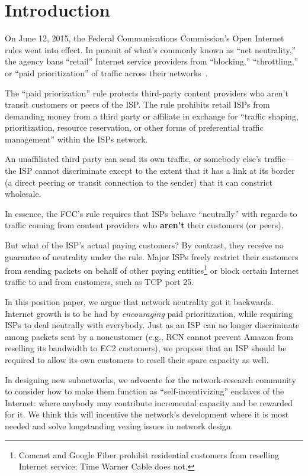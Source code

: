 \section{Introduction}

\label{sec:intro}

On June 12, 2015, the Federal Communications Commission's Open
Internet rules went into effect. In pursuit of what's commonly known
as ``net neutrality,'' the agency bans ``retail'' Internet service
providers from ``blocking,'' ``throttling,'' or ``paid
prioritization'' of traffic across their networks~\cite{openinternet}.

The ``paid priorization'' rule protects third-party
content providers who aren't transit customers or peers of the
ISP. The rule prohibits retail ISPs from demanding money from a third
party or affiliate in exchange for ``traffic shaping, prioritization,
resource reservation, or other forms of preferential traffic
management'' within the ISPs network.

An unaffiliated third party can send its own traffic, or somebody
else's traffic---the ISP cannot discriminate except to the extent that
it has a link at its border (a direct peering or transit connection to
the sender) that it can constrict wholesale.

In essence, the FCC's rule requires that ISPs behave ``neutrally''
with regards to traffic coming from content providers who
\textbf{aren't} their customers (or peers).

But what of the ISP's actual paying customers? By contrast, they
receive no guarantee of neutrality under the rule. Major ISPs freely
restrict their customers from sending packets on behalf of other
paying entities\footnote{Comcast and Google Fiber prohibit residential
  customers from reselling Internet service; Time Warner Cable does
  not.} or block certain Internet traffic to and from
customers, such as TCP port 25.

In this position paper, we argue that network neutrality got it
backwards. Internet growth is to be had by \emph{encouraging} paid
prioritization, while requiring ISPs to deal neutrally with
everybody. Just as an ISP can no longer discriminate among packets
sent by a noncustomer (e.g., RCN cannot prevent Amazon from reselling
its bandwidth to EC2 customers), we propose that an ISP should be
required to allow its own customers to resell their spare capacity as
well.

In designing new subnetworks, we advocate for the network-research
community to consider how to make them function as
``self-incentivizing'' enclaves of the Internet: where anybody may
contribute incremental capacity and be rewarded for it. We think this
will incentive the network's development where it is most needed and
solve longstanding vexing issues in network design.

